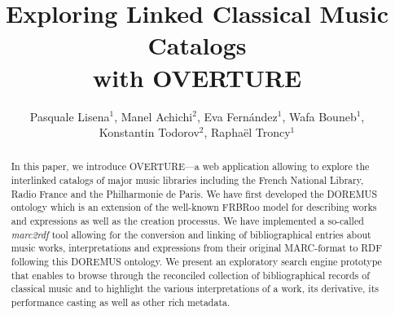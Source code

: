 \documentclass[runningheads,a4paper]{llncs}
\begin{document}
\title{Exploring Linked Classical Music Catalogs\\ with OVERTURE}

\author{Pasquale Lisena$^1$, Manel Achichi$^2$, Eva Fern\'{a}ndez$^1$, Wafa Bouneb$^1$, \\ Konstantin Todorov$^2$, Rapha\"{e}l Troncy$^1$}

\maketitle


\begin{abstract}
In this paper, we introduce OVERTURE---a web application allowing to explore the interlinked catalogs of major music libraries including the French National Library, Radio France and the Philharmonie de Paris. We have first developed the DOREMUS ontology which is an extension of the well-known FRBRoo model for describing works and expressions as well as the creation processus. We have implemented a so-called {\it marc2rdf} tool allowing for the conversion and linking of bibliographical entries about music works, interpretations and expressions from their original MARC-format to RDF following this DOREMUS ontology. We present an exploratory search engine prototype that enables to browse through the reconciled collection of bibliographical records of classical music and to highlight the various interpretations of a work, its derivative, its performance casting as well as other rich metadata.
\end{abstract}

\end{document}
